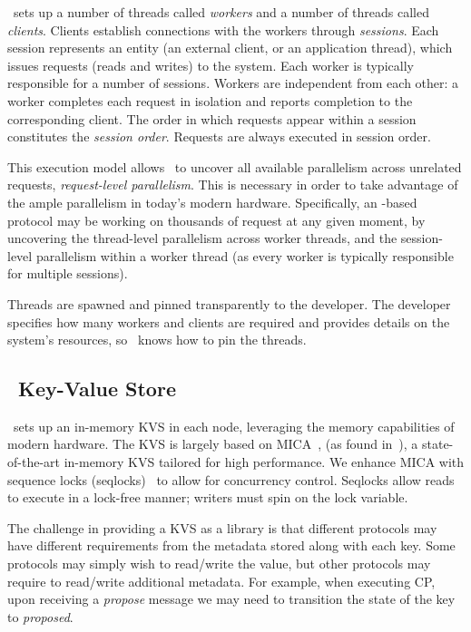 \odlib~sets up a number of threads called \emph{workers} and a number of threads called \emph{clients}. 
Clients establish connections with the workers through \emph{sessions}. 
Each session represents an entity (\eg an external client, or an application thread), which issues requests (reads and writes) to the system.
Each worker is typically responsible for a number of sessions. 
Workers are independent from each other: a worker completes each request in isolation and reports completion 
to the corresponding client. 
The order in which requests appear within a session constitutes the \emph{session order}. 
Requests are always executed in session order.

This execution model allows \odlib~to uncover all available parallelism across unrelated requests, \ie \emph{request-level parallelism}. This is necessary in order to take advantage of the ample parallelism in today's modern hardware.
Specifically, an \odlib-based protocol may be working on thousands of request at any given moment, by uncovering
the thread-level parallelism across worker threads, 
and the ses\-sion-level parallelism within a worker thread (as every worker is typically responsible for multiple sessions).

Threads are spawned and pinned transparently to the developer.
The developer specifies how many workers and clients are required and provides details on the system's resources, so \odlib~knows how to pin the threads.


\subsection{\odlib~Key-Value Store} \label{sec:kvs}

\odlib~sets up an in-memory KVS in each node, 
leveraging the memory capabilities of modern hardware.
The KVS is largely based on MICA~\cite{Lim:2014}, (as found in~\cite{Kalia:2014}), a state-of-the-art in-memory KVS tailored for high performance. We enhance MICA with sequence locks (seqlocks)~\cite{Lameter:2005} 
to allow for concurrency control. Seqlocks allow reads to execute in a lock-free manner; writers must spin on the lock variable.

The challenge in providing a KVS as a library is that different protocols may have different requirements from the metadata stored along with each key. 
Some protocols may simply wish to read/write the value, but other protocols may require to read/write additional metadata. 
For example, when executing CP, upon receiving a \emph{propose} message we may need to transition the state of the key to \emph{proposed}.


